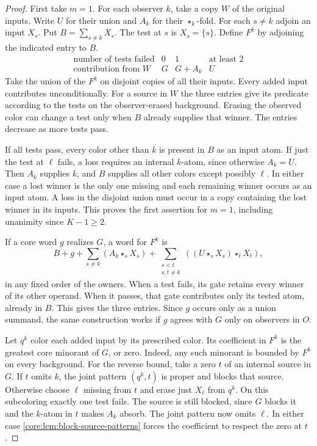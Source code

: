 \begin{proof}
First take $m=1$. For each observer $k$, take a copy $W$ of the
original inputs. Write
$U$ for their union and $A_k$ for their $\star_k$-fold. For each
$s\ne k$ adjoin an input $X_s$. Put
$B=\sum_{s\ne k}X_s$. The test at $s$ is $X_s=\{s\}$. Define $F^k$
by adjoining the indicated entry to $B$.
\[
\begin{array}{c|ccc}
 \text{number of tests failed}&0&1&\text{at least }2\\ \hline
 \text{contribution from }W& G&G+A_k&U
\end{array}
\]
Take the union of the $F^k$ on disjoint copies of all their inputs.
Every added input contributes unconditionally. For a source in $W$ the three
entries give its predicate according to the tests on the
observer-erased background. Erasing the observed color can change
a test only when $B$ already supplies that winner. The entries
decrease as more tests pass.

If all tests pass, every color other than $k$ is present in $B$
as an input atom. If just the test at $\ell$ fails, a loss requires
an internal $k$-atom, since otherwise $A_k=U$. Then $A_k$ supplies
$k$, and $B$ supplies all other colors except possibly $\ell$.
In either case a lost winner is the only one missing and each
remaining winner occurs as an input atom. A loss in the disjoint
union must occur in a copy containing the lost winner in its inputs.
This proves the first assertion for $m=1$, including unanimity since
$K-1\geq2$.

If a core word $g$ realizes $G$, a word for $F^k$ is
\[
 B+g+\sum_{s\ne k}(A_k\star_s X_s)
 +\sum_{\substack{s<t\\s,t\ne k}}((U\star_s X_s)\star_t X_t),
\]
in any fixed order of the owners. When a test fails, its gate retains
every winner of its other operand. When it passes, that gate
contributes only its tested atom, already in $B$. This gives the
three entries. Since $g$ occurs only as a union summand, the same
construction works if $g$ agrees with $G$ only on observers in $O$.

Let $q^k$ color each added input by its prescribed color. Its
coefficient in $F^k$ is the greatest core minorant of $G$, or zero.
Indeed, any such minorant is bounded by $F^k$ on every background.
For the reverse bound, take a zero $t$ of an internal source in $G$.
If $t$ omits $k$, the joint pattern $(q^k,t)$ is proper and blocks
that source. Otherwise choose $\ell$ missing from $t$ and erase just
$X_\ell$ from $q^k$. On this subcoloring exactly
one test fails. The source is still blocked, since $G$ blocks it and
the $k$-atom in $t$ makes $A_k$ absorb. The joint pattern now
omits $\ell$. In either case \cref{core:lem:block-source-patterns}
forces the coefficient to respect the zero at $t$.


\end{proof}

